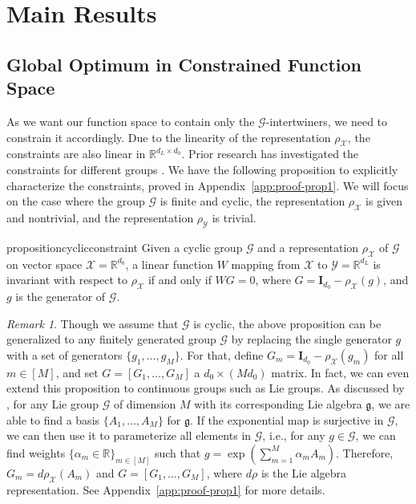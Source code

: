 \documentclass{article}
\newcommand{\G}{\mathcal{G}}
\newcommand{\R}{\mathbb{R}}
\theoremstyle{plain}
\theoremstyle{definition}
\theoremstyle{remark}
\newtheorem{remark}[theorem]{Remark}
\theoremstyle{remark}
\begin{document}
\section{Main Results}
\subsection{Global Optimum in Constrained Function Space} 
\label{sec:constrained-function-space}

As we want our function space to contain only the $\mathcal{G}$-intertwiners, we need to constrain it accordingly.
Due to the linearity of the representation $\rho_{\mathcal{X}}$, the constraints are also linear in $\mathbb{R}^{d_L\times d_0}$. 
Prior research has investigated the constraints for different groups \citep[see, e.g.,][]{maron_2018, puny_2023, finzi_2021}. We have the following proposition to explicitly characterize the constraints, proved in Appendix~\ref{app:proof-prop1}. We will focus on the case where the group $\mathcal{G}$ is finite and cyclic, the representation $\rho_{\mathcal{X}}$ is given and nontrivial, and the representation $\rho_{\mathcal{Y}}$ is trivial. 
\begin{restatable}{proposition}{cyclicconstraint}
\label{cyclic_constraint}
  Given a cyclic group $\mathcal{G}$ and a representation $\rho_{\mathcal{X}}$ of $\mathcal{G}$ on vector space $\mathcal{X} = \mathbb{R}^{d_0}$, a linear function $W$ mapping from $\mathcal{X}$ to $\mathcal{Y} = \mathbb{R}^{d_L}$ is invariant with respect to $\rho_{\mathcal{X}}$ if and only if $W G = 0$, where $G = \mathbf{I}_{d_0}-\rho_{\mathcal{X}}(g)$, and $g$ is the generator of $\mathcal{G}$.
\end{restatable}

\begin{remark}
  Though we assume that $\mathcal{G}$ is cyclic, the above proposition can be generalized to any finitely generated group $\mathcal{G}$ by replacing the single generator $g$ with a set of generators $\{g_1, \dots, g_M\}$. 
  For that, define $G_m = \mathbf{I}_{d_0}- \rho_{\mathcal{X}}(g_m)$ for all $m \in [M]$, and set $G = [G_1, \dots, G_M]$ a $d_0\times (M d_0)$ matrix. 
  In fact, we can even extend this proposition to continuous groups such as Lie groups. As discussed by \citet{finzi_2021}, for any  Lie group $\mathcal{G}$ of dimension $M$ with its corresponding Lie algebra $\mathfrak{g}$, we are able to find a basis $\{A_1,  \dots, A_{M}\}$ for $\mathfrak{g}$. If the exponential map is surjective in $\G$, we can then use it to parameterize all elements in $\mathcal{G}$, i.e., for any $g\in \mathcal{G}$, we can find weights $\{\alpha_m \in \R \}_{m \in [M]}$ such that $g = \exp{(\sum_{m=1}^{M}{\alpha_m A_m})}$. Therefore, $G_m = d\rho_{\mathcal{X}}(A_m)$ and $G = [G_1, \dots, G_M]$, where $d\rho$ is the Lie algebra representation. See Appendix~\ref{app:proof-prop1} for more details.
\end{remark}
\end{document}
